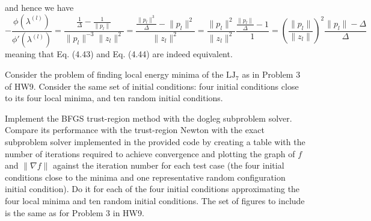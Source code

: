 \documentclass{../kin_math}
\begin{document}
\begin{questions}
\begin{solution}
    and hence we have
    \begin{equation*}
      -\frac{\phi(\lambda^{(l)})}{\phi'(\lambda^{(l)})} = \dfrac{\frac{1}{\Delta} - \frac{1}{\lVert p_l \rVert}}{\lVert p_l \rVert^{-3} \lVert z_l \rVert^2} = \dfrac{\frac{\lVert p_l \rVert^{3}}{\Delta} - \lVert p_l \rVert^2}{\lVert z_l \rVert^2} = \dfrac{\lVert p_l \rVert^2}{\lVert z_l \rVert^2} \dfrac{\frac{\lVert p_l \rVert}{\Delta} - 1}{1} = \left(\frac{\lVert p_l \rVert}{\lVert z_l \rVert}\right)^2 \frac{\lVert p_l \rVert - \Delta}{\Delta}
    \end{equation*}
    meaning that Eq. (4.43) and Eq. (4.44) are indeed equivalent.
  \end{solution}

  \question Consider the problem of finding local energy minima of the $\text{LJ}_7$ as in Problem 3 of HW9. Consider the same set of initial conditions: four initial conditions close to its four local minima, and ten random initial conditions.

  Implement the BFGS trust-region method with the dogleg subproblem solver. Compare its performance with the trust-region Newton with the exact subproblem solver implemented in the provided code by creating a table with the number of iterations required to achieve convergence and plotting the graph of $f$ and $\lVert \nabla f \rVert$ against the iteration number for each test case (the four initial conditions close to the minima and one representative random configuration initial condition). Do it for each of the four initial conditions approximating the four local minima and ten random initial conditions. The set of figures to include is the same as for Problem 3 in HW9.


\end{questions}
\end{document}
